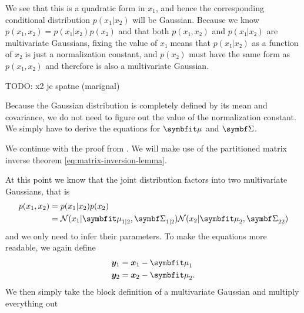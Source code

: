 We see that this is a quadratic form in $x_1$, and hence the corresponding
conditional distribution $p(x_1 | x_2)$ will be Gaussian. Because we know
$p(x₁, x₂) = p(x₁|x₂)p(x₂)$ and that both $p(x₁, x₂)$ and $p(x₁|x₂)$ are
multivariate Gaussians, fixing the value of $x₁$ means that $p(x₁|x₂)$ as a
function of $x₂$ is just a normalization constant, and $p(x₂)$ must have the
same form as $p(x₁, x₂)$ and therefore is also a multivariate Gaussian.

TODO: x2 je spatne (marignal)

Because the Gaussian distribution is completely defined by its mean and
covariance, we do not need to figure out the value of the normalization
constant. We simply have to derive the equations for $\vmu$ and $\mSigma$.

We continue with the proof from \cite{murphy2012machine}. We will make use of
the partitioned matrix inverse theorem \autoref{eq:matrix-inversion-lemma}.

At this point we know that the joint distribution factors into two multivariate
Gaussians, that is
\begin{align}
  p(x_1, x_2) &= p(x_1 | x_2) p(x_2) \\
              &= \gN(x_1 | \vmu_{1|2}, \ms{1|2}) \gN(x_2 | \vmu_2, \ms{22})
\end{align}
and we only need to infer their parameters.  To make the equations more
readable, we again define
\begin{align}
    \vy_1 &= \vx_1 - \vmu_1 \\
    \vy_2 &= \vx_2 - \vmu_2.
\end{align}
We then simply take the block definition of a multivariate Gaussian and
multiply everything out

